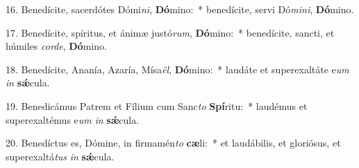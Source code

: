 16. Benedícite, sacerdótes Dómi\textit{ni}, \textbf{Dó}mino:~* benedícite, servi Dó\textit{mi}\textit{ni}, \textbf{Dó}mino.

17. Benedícite, spíritus, et ánimæ justó\textit{rum}, \textbf{Dó}mino:~* benedícite, sancti, et húmiles \textit{cor}\textit{de}, \textbf{Dó}mino.

18. Benedícite, Ananía, Azaría, Mísa\textit{ël}, \textbf{Dó}mino:~* laudáte et superexaltáte e\textit{um} \textit{in} \textbf{s\'{\ae}}cula.

19. Benedicámus Patrem et Fílium cum Sanc\textit{to} \textbf{Spí}ritu:~* laudémus et superexaltémus e\textit{um} \textit{in} \textbf{s\'{\ae}}cula.

20. Benedíctus es, Dómine, in firmamén\textit{to} \textbf{cæ}li:~* et laudábilis, et gloriósus, et superexaltá\textit{tus} \textit{in} \textbf{s\'{\ae}}cula.
